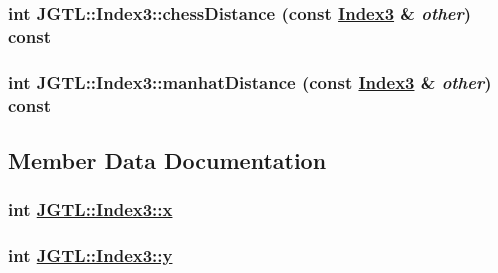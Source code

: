 \hypertarget{class_j_g_t_l_1_1_index3_acc8cad7f6ec9534c32c4a224c3b3670}{
\subsubsection[chessDistance]{\setlength{\rightskip}{0pt plus 5cm}int JGTL::Index3::chess\-Distance (const \hyperlink{class_j_g_t_l_1_1_index3}{Index3} \& {\em other}) const}}
\label{class_j_g_t_l_1_1_index3_acc8cad7f6ec9534c32c4a224c3b3670}


\hypertarget{class_j_g_t_l_1_1_index3_97c6ed2e02b405f2e7c02208a54367c9}{
\subsubsection[manhatDistance]{\setlength{\rightskip}{0pt plus 5cm}int JGTL::Index3::manhat\-Distance (const \hyperlink{class_j_g_t_l_1_1_index3}{Index3} \& {\em other}) const}}
\label{class_j_g_t_l_1_1_index3_97c6ed2e02b405f2e7c02208a54367c9}




\subsection{Member Data Documentation}
\hypertarget{class_j_g_t_l_1_1_index3_01306b4a1effbab2bf1358adb85ef7a1}{
\subsubsection[x]{\setlength{\rightskip}{0pt plus 5cm}int \hyperlink{class_j_g_t_l_1_1_index3_01306b4a1effbab2bf1358adb85ef7a1}{JGTL::Index3::x}}}
\label{class_j_g_t_l_1_1_index3_01306b4a1effbab2bf1358adb85ef7a1}


\hypertarget{class_j_g_t_l_1_1_index3_5723b9b685b7aaf559464973d1338e23}{
\subsubsection[y]{\setlength{\rightskip}{0pt plus 5cm}int \hyperlink{class_j_g_t_l_1_1_index3_5723b9b685b7aaf559464973d1338e23}{JGTL::Index3::y}}}
\label{class_j_g_t_l_1_1_index3_5723b9b685b7aaf559464973d1338e23}


